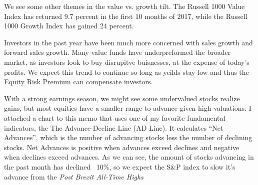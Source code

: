 \documentclass[11pt,pressrelease]{newlfm} %
\begin{document}
\begin{newlfm}
\begin{singlespace}
\begin{enumerate}
We see some other themes in the value vs. growth tilt. The Russell 1000 Value Index has returned 9.7 percent in the first 10 months of 2017, while the Russell 1000 Growth Index has gained 24 percent. 


 Investors in the past year have been much more concerned with sales growth and forward sales growth. Many value funds have underpreformed the broader market, as investors look to buy disrupitve buisnesses,  at the expense of today's profits. We expect this trend to continue so long as yeilds stay low and thus the Equity Risk Premium can compensate investors.



With a strong earnings season, we might see some undervalued stocks realize gains, but most equities have a smaller range to advance given high valuations. I attached a chart to this memo that uses one of my favorite fundamental indicators, the The Advance-Decline Line (AD Line). It calculates ``Net Advances'', which is the number of advancing stocks less the number of declining stocks. Net Advances is positive when advances exceed declines and negative when declines exceed advances. As we can see, the amount of stocks advancing in the past month has declined ~10\%, so we expect the S\&P index to slow it's advance from the \textit{Post Brexit All-Time Highs}

\begin{center}
\end{center}


\end{enumerate}
\end{singlespace}
\end{newlfm}
\end{document}
